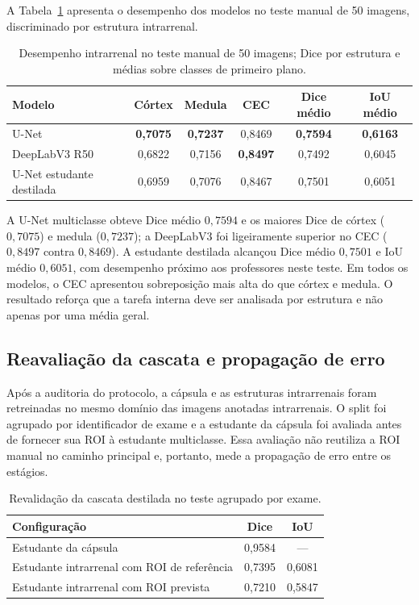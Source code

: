 \documentclass[12pt]{article}
\begin{document}
A Tabela~\ref{tab:intrarenal} apresenta o desempenho dos modelos no teste manual de 50 imagens, discriminado por estrutura intrarrenal.

\begin{table}[!htbp]
\centering
\caption[Desempenho de segmentação por estrutura intrarrenal]{Desempenho intrarrenal no teste manual de 50 imagens; Dice por estrutura e médias sobre classes de primeiro plano.}
\label{tab:intrarenal}
\begin{tabular}{lccccc}
\toprule
\textbf{Modelo} & \textbf{Córtex} & \textbf{Medula} & \textbf{CEC} & \textbf{Dice médio} & \textbf{IoU médio} \\
\midrule
U-Net & \textbf{0,7075} & \textbf{0,7237} & 0,8469 & \textbf{0,7594} & \textbf{0,6163} \\
DeepLabV3 R50 & 0,6822 & 0,7156 & \textbf{0,8497} & 0,7492 & 0,6045 \\
U-Net estudante destilada & 0,6959 & 0,7076 & 0,8467 & 0,7501 & 0,6051 \\
\bottomrule
\end{tabular}
\end{table}

A U-Net multiclasse obteve Dice médio $0{,}7594$ e os maiores Dice de córtex ($0{,}7075$) e medula ($0{,}7237$); a DeepLabV3 foi ligeiramente superior no CEC ($0{,}8497$ contra $0{,}8469$). A estudante destilada alcançou Dice médio $0{,}7501$ e IoU médio $0{,}6051$, com desempenho próximo aos professores neste teste. Em todos os modelos, o CEC apresentou sobreposição mais alta do que córtex e medula. O resultado reforça que a tarefa interna deve ser analisada por estrutura e não apenas por uma média geral.


\subsection{Reavaliação da cascata e propagação de erro}

Após a auditoria do protocolo, a cápsula e as estruturas intrarrenais foram
retreinadas no mesmo domínio das imagens anotadas intrarrenais. O split foi
agrupado por identificador de exame e a estudante da cápsula foi avaliada antes
de fornecer sua ROI à estudante multiclasse. Essa avaliação não reutiliza a
ROI manual no caminho principal e, portanto, mede a propagação de erro entre
os estágios.

\begin{table}[!htbp]
\centering
\scriptsize
\caption[Revalidação agrupada da cascata destilada]{Revalidação da cascata destilada no teste agrupado por exame.}
\label{tab:cascata_agrupada}
\begin{tabular}{lcc}
\toprule
\textbf{Configuração} & \textbf{Dice} & \textbf{IoU} \\
\midrule
Estudante da cápsula & 0,9584 & --- \\
Estudante intrarrenal com ROI de referência & 0,7395 & 0,6081 \\
Estudante intrarrenal com ROI prevista & 0,7210 & 0,5847 \\
\bottomrule
\end{tabular}
\end{table}
\end{document}
